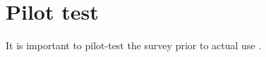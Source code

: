 \chapter*{Pilot test}

It is important to pilot-test the survey prior to actual use \citep{Ben2009}. 